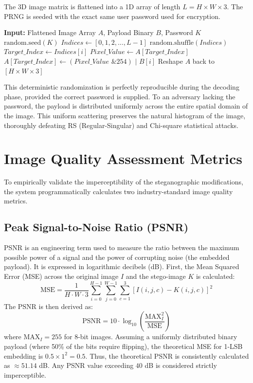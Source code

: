 \documentclass[12pt,a4paper]{report}
\begin{document}
The 3D image matrix is flattened into a 1D array of length $L = H \times W \times 3$. The PRNG is seeded with the exact same user password used for encryption. 
\begin{algorithm}[H]
\caption{PRNG Pixel Scattering}
\label{alg:prng_scatter}
\begin{algorithmic}[1]
\STATE \textbf{Input:} Flattened Image Array $A$, Payload Binary $B$, Password $K$
\STATE $\text{random.seed}(K)$
\STATE $Indices \leftarrow [0, 1, 2, \dots, L-1]$
\STATE $\text{random.shuffle}(Indices)$ 
    \STATE $Target\_Index \leftarrow Indices[i]$
    \STATE $Pixel\_Value \leftarrow A[Target\_Index]$
    \STATE $A[Target\_Index] \leftarrow (Pixel\_Value \text{ \& } 254) \text{ | } B[i]$
\ENDFOR
\STATE Reshape $A$ back to $[H \times W \times 3]$
\end{algorithmic}
\end{algorithm}
This deterministic randomization is perfectly reproducible during the decoding phase, provided the correct password is supplied. To an adversary lacking the password, the payload is distributed uniformly across the entire spatial domain of the image. This uniform scattering preserves the natural histogram of the image, thoroughly defeating RS (Regular-Singular) and Chi-square statistical attacks.

\section{Image Quality Assessment Metrics}
To empirically validate the imperceptibility of the steganographic modifications, the system programmatically calculates two industry-standard image quality metrics.

\subsection{Peak Signal-to-Noise Ratio (PSNR)}
PSNR is an engineering term used to measure the ratio between the maximum possible power of a signal and the power of corrupting noise (the embedded payload). It is expressed in logarithmic decibels (dB).
First, the Mean Squared Error (MSE) across the original image $I$ and the stego-image $K$ is calculated:
\begin{equation}
    \text{MSE} = \frac{1}{H \cdot W \cdot 3} \sum_{i=0}^{H-1} \sum_{j=0}^{W-1} \sum_{c=1}^{3} [I(i,j,c) - K(i,j,c)]^2
\end{equation}
The PSNR is then derived as:
\begin{equation}
    \text{PSNR} = 10 \cdot \log_{10}\left(\frac{\text{MAX}_I^2}{\text{MSE}}\right)
\end{equation}
where $\text{MAX}_I = 255$ for 8-bit images.
Assuming a uniformly distributed binary payload (where 50\% of the bits require flipping), the theoretical MSE for 1-LSB embedding is $0.5 \times 1^2 = 0.5$. Thus, the theoretical PSNR is consistently calculated as $\approx 51.14$ dB. Any PSNR value exceeding $40$ dB is considered strictly imperceptible.
\end{document}
